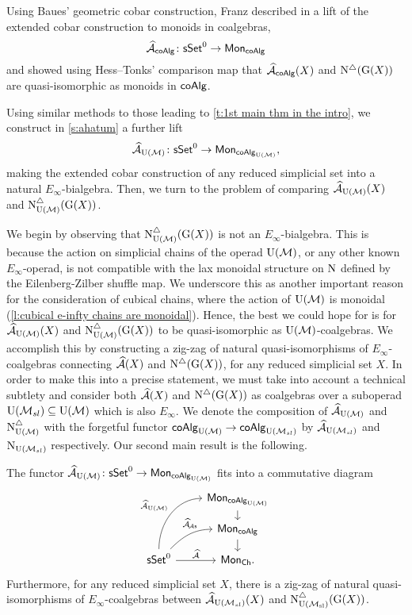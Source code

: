 
Using Baues’ geometric cobar construction, Franz described in \cite{franz2020szczarba} a lift of the extended cobar construction to monoids in coalgebras,
\[
\Ahat_{\coAlg} \colon \sSet^0 \to \Mon_{\coAlg}
\]
and showed using Hess--Tonks' comparison map that $\Ahat_{\coAlg}(X)$ and $\schains(\kan(X))$ are quasi-isomorphic as monoids in $\coAlg$.


Using similar methods to those leading to \cref{t:1st main thm in the intro}, we construct in \cref{s:ahatum} a further lift
\[
\Ahat_\UM \colon \sSet^0 \to \Mon_{\coAlg_\UM},
\]
making the extended cobar construction of any reduced simplicial set into a natural $E_\infty$-bialgebra.
Then, we turn to the problem of comparing $\Ahat_\UM(X)$ and $\schainsUM(\kan(X))$.

We begin by observing that $\schainsUM(\kan(X))$ is not an $E_\infty$-bialgebra.
This is because the action on simplicial chains of the operad $\UM$, or any other known $E_\infty$-operad, is not compatible with the lax monoidal structure on $\chains$ defined by the Eilenberg-Zilber shuffle map.
We underscore this as another important reason for the consideration of cubical chains, where the action of $\UM$ is monoidal (\cref{l:cubical e-infty chains are monoidal}).
Hence, the best we could hope for is for $\Ahat_\UM(X)$ and $\schainsUM(\kan(X))$ to be quasi-isomorphic as $\UM$-coalgebras.
We accomplish this by constructing a zig-zag of natural quasi-isomorphisms of $E_{\infty}$-coalgebras connecting $\Ahat(X)$ and $\schains(\kan(X))$, for any reduced simplicial set $X$.
In order to make this into a precise statement, we must take into account a technical subtlety and consider both $\Ahat(X)$ and $\schains(\kan(X))$ as coalgebras over a suboperad $\USL \subseteq \UM$ which is also $E_\infty$.
We denote the composition of $\Ahat_\UM$ and $\schainsUM$ with the forgetful functor $\coAlg_\UM \to \coAlg_\USL$ by $\Ahat_\USL$ and $\chains_\USL$ respectively.
Our second main result is the following.

\begin{theorem} \label{t:2nd main thm in the intro}
	The functor $\Ahat_\UM \colon \sSet^0 \to \Mon_{\coAlg_\UM}$ fits into a commutative diagram
	\[
	\begin{tikzcd}[row sep=small]
	& \Mon_{\coAlg_\UM} \arrow[d] \\
	& \Mon_{\coAlg} \arrow[d] \\
	\sSet^0
	\arrow[r, "\Ahat", ]
	\arrow[ru, "\Ahat_{\!\As}", out=45, in=180, near end]
	\arrow[ruu, "\Ahat_\UM", out=90, in=180]
	& \Mon_{\Ch}.
	\end{tikzcd}
	\]
	Furthermore, for any reduced simplicial set $X$, there is a zig-zag of natural quasi-isomorphisms of $E_\infty$-coalgebras between $\Ahat_\USL(X)$ and $\schainsUSL(\kan(X))$.
\end{theorem}

